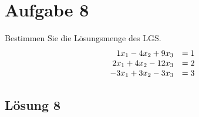 \section{Aufgabe 8}

Bestimmen Sie die Lösungsmenge des LGS. 
\begin{equation*}
  \begin{array}{ r l }
    1x_{1} -4x_{2} +9x_{3} & =1\\
    2x_{1} +4x_{2} -12x_{3} & =2\\
    -3x_{1} +3x_{2} -3x_{3} & =3
  \end{array}
\end{equation*}

\subsection{Lösung 8}

